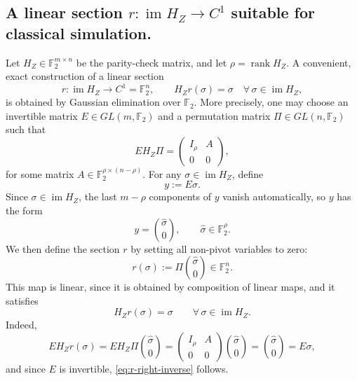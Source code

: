\documentclass[twoside,english,aps,showpacs,pra,superscriptaddress]{revtex4-2}
\DeclareMathOperator{\rank}{rank}
\DeclareMathOperator{\im}{im}
\begin{document}
\subsection{A linear section \(r:\im H_Z\to C^1\) suitable for classical simulation.}
Let \(H_Z\in \mathbb F_2^{m\times n}\) be the parity-check matrix, and let \(\rho=\rank H_Z\). 
A convenient, exact construction of a linear section
\begin{equation}\label{eq:r-section-def}
    r:\im H_Z\to C^1=\mathbb F_2^n,
    \qquad
    H_Z r(\sigma)=\sigma \quad \forall\, \sigma\in \im H_Z,
\end{equation}
is obtained by Gaussian elimination over \(\mathbb F_2\). 
More precisely, one may choose an invertible matrix \(E\in GL(m,\mathbb F_2)\) and a permutation matrix \(\Pi\in GL(n,\mathbb F_2)\) such that
\begin{equation}\label{eq:HZ-systematic}
    E H_Z \Pi
    =
    \begin{pmatrix}
        I_\rho & A\\
        0 & 0
    \end{pmatrix},
\end{equation}
for some matrix \(A\in \mathbb F_2^{\rho\times (n-\rho)}\). 
For any \(\sigma\in \im H_Z\), define
\begin{equation}\label{eq:y-def}
    y:=E\sigma.
\end{equation}
Since \(\sigma\in \im H_Z\), the last \(m-\rho\) components of \(y\) vanish automatically, so \(y\) has the form
\begin{equation}\label{eq:y-split}
    y=
    \binom{\hat \sigma}{0},
    \qquad
    \hat \sigma\in \mathbb F_2^\rho.
\end{equation}
We then define the section \(r\) by setting all non-pivot variables to zero:
\begin{equation}\label{eq:r-def-systematic}
    r(\sigma):=
    \Pi
    \binom{\hat \sigma}{0}
    \in \mathbb F_2^n.
\end{equation}
This map is linear, since it is obtained by composition of linear maps, and it satisfies
\begin{equation}\label{eq:r-right-inverse}
    H_Z r(\sigma)=\sigma
    \qquad \forall\, \sigma\in \im H_Z.
\end{equation}
Indeed,
\begin{equation}\label{eq:r-right-inverse-proof}
    E H_Z r(\sigma)
    =
    E H_Z \Pi \binom{\hat \sigma}{0}
    =
    \begin{pmatrix}
        I_\rho & A\\
        0 & 0
    \end{pmatrix}
    \binom{\hat \sigma}{0}
    =
    \binom{\hat \sigma}{0}
    =
    E\sigma,
\end{equation}
and since \(E\) is invertible, \eqref{eq:r-right-inverse} follows.
\end{document}
